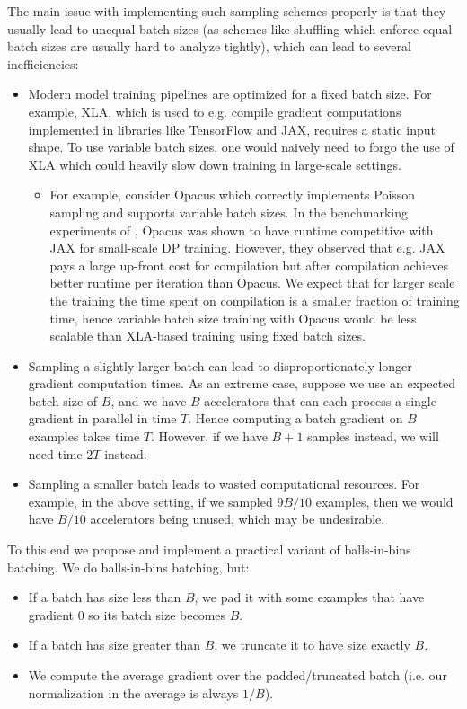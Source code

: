 The main issue with implementing such sampling schemes properly is that they usually lead to unequal batch sizes (as schemes like shuffling which enforce equal batch sizes are usually hard to analyze tightly), which can lead to several inefficiencies:

\begin{itemize}
    \item Modern model training pipelines are optimized for a fixed batch size. For example, XLA, which is used to e.g. compile gradient computations implemented in libraries like TensorFlow and JAX, requires a static input shape. To use variable batch sizes, one would naively need to forgo the use of XLA which could heavily slow down training in large-scale settings.
    \begin{itemize}
        \item For example, consider Opacus which correctly implements Poisson sampling and supports variable batch sizes. In the benchmarking experiments of \citep{opacus}, Opacus was shown to have runtime competitive with JAX for small-scale DP training. However, they observed that e.g. JAX pays a large up-front cost for compilation but after compilation achieves better runtime per iteration than Opacus. We expect that for larger scale the training the time spent on compilation is a smaller fraction of training time, hence variable batch size training with Opacus would be less scalable than XLA-based training using fixed batch sizes.
    \end{itemize}
    \item Sampling a slightly larger batch can lead to disproportionately longer gradient computation times. As an extreme case, suppose we use an expected batch size of $B$, and we have $B$ accelerators that can each process a single gradient in parallel in time $T$. Hence computing a batch gradient on $B$ examples takes time $T$. However, if we have $B+1$ samples instead, we will need time $2T$ instead.
    \item Sampling a smaller batch leads to wasted computational resources. For example, in the above setting, if we sampled $9B/10$ examples, then we would have $B/10$ accelerators being unused, which may be undesirable.
\end{itemize}

To this end we propose and implement a practical variant of balls-in-bins batching. We do balls-in-bins batching, but:
\begin{itemize}
    \item If a batch has size less than $B$, we pad it with some examples that have gradient 0 so its batch size becomes $B$.
    \item If a batch has size greater than $B$, we truncate it to have size exactly $B$.
    \item We compute the average gradient over the padded/truncated batch (i.e. our normalization in the average is always $1/B$).
\end{itemize}

